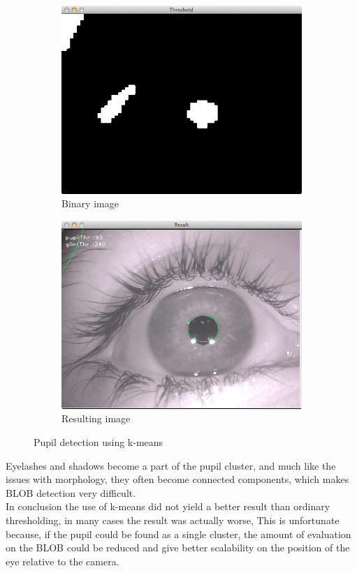 \documentclass[a4paper,11pt]{article}
\begin{document}
\begin{figure}[ht]
\centering
\begin{subfigure}{.5\textwidth}
  \centering
  \includegraphics[width=.8\linewidth]{kmean_bin}
  \caption{Binary image}
  \label{fig:kmeans_binary}
\end{subfigure}%
\begin{subfigure}{.5\textwidth}
  \centering
  \includegraphics[width=.8\linewidth]{kmean_result}
  \caption{Resulting image}
  \label{fig:kmeans_result}
\end{subfigure}
\caption{Pupil detection using k-means}
\label{fig:kmeans}
\end{figure}

Eyelashes and shadows become a part of the pupil cluster, and much like the issues with morphology, they often become connected components, which makes BLOB detection very difficult.\\

In conclusion the use of k-means did not yield a better result than ordinary thresholding, in many cases the result was actually worse, This is unfortunate because, if the pupil could be found as a single cluster, the amount of evaluation on the BLOB could be reduced and give better scalability on the position of the eye relative to the camera.
\end{document}
